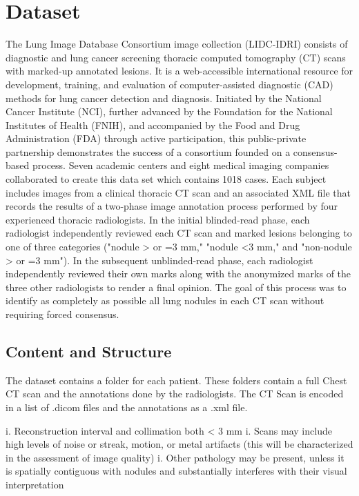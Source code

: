 \documentclass[../Thesis.tex]{subfiles}
\begin{document}
\chapter{Dataset}
The Lung Image Database Consortium image collection (LIDC-IDRI) consists of diagnostic and lung cancer screening thoracic computed tomography (CT) scans with marked-up annotated lesions. It is a web-accessible international resource for development, training, and evaluation of computer-assisted diagnostic (CAD) methods for lung cancer detection and diagnosis. Initiated by the National Cancer Institute (NCI), further advanced by the Foundation for the National Institutes of Health (FNIH), and accompanied by the Food and Drug Administration (FDA) through active participation, this public-private partnership demonstrates the success of a consortium founded on a consensus-based process.
Seven academic centers and eight medical imaging companies collaborated to create this data set which contains 1018 cases.  Each subject includes images from a clinical thoracic CT scan and an associated XML file that records the results of a two-phase image annotation process performed by four experienced thoracic radiologists. In the initial blinded-read phase, each radiologist independently reviewed each CT scan and marked lesions belonging to one of three categories ("nodule > or =3 mm," "nodule <3 mm," and "non-nodule > or =3 mm"). In the subsequent unblinded-read phase, each radiologist independently reviewed their own marks along with the anonymized marks of the three other radiologists to render a final opinion. The goal of this process was to identify as completely as possible all lung nodules in each CT scan without requiring forced consensus. \cite{armato2011lung}

\section{Content and Structure}
The dataset contains a folder for each patient. These folders contain a full Chest CT scan and the annotations done by the radiologists. The CT Scan is encoded in a list of .dicom files and the annotations as a .xml file.

i.	Reconstruction interval and collimation both < 3 mm
i.	Scans may include high levels of noise or streak, motion, or metal artifacts (this will be characterized in the assessment of image quality)
i.	Other pathology may be present, unless it is spatially contiguous with nodules and substantially interferes with their visual interpretation
\end{document}
